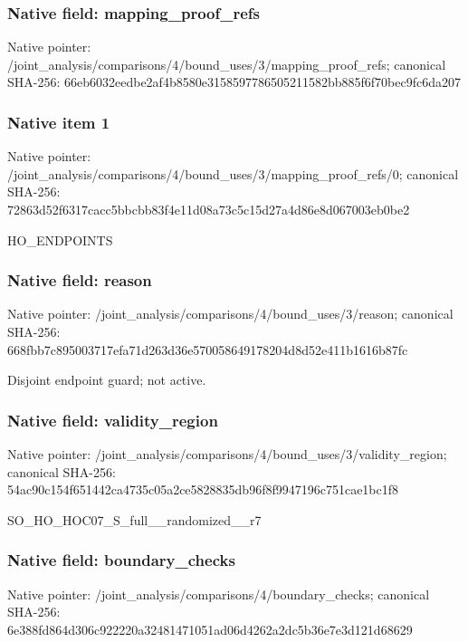 \documentclass[10pt,a4paper]{article}
\begin{document}
\subsubsection{Native field: mapping\_\allowbreak{}proof\_\allowbreak{}refs}
Native pointer: /joint\_\allowbreak{}analysis/comparisons/4/bound\_\allowbreak{}uses/3/mapping\_\allowbreak{}proof\_\allowbreak{}refs; canonical SHA-256: 66eb6032eedbe2af4b8580e3158597786505211582bb885f6f70bec9fc6da207

\subsubsection{Native item 1}
Native pointer: /joint\_\allowbreak{}analysis/comparisons/4/bound\_\allowbreak{}uses/3/mapping\_\allowbreak{}proof\_\allowbreak{}refs/0; canonical SHA-256: 72863d52f6317cacc5bbcbb83f4e11d08a73c5c15d27a4d86e8d067003eb0be2

\begingroup\raggedright\sloppy HO\_\allowbreak{}ENDPOINTS\par\endgroup

\subsubsection{Native field: reason}
Native pointer: /joint\_\allowbreak{}analysis/comparisons/4/bound\_\allowbreak{}uses/3/reason; canonical SHA-256: 668fbb7c895003717efa71d263d36e570058649178204d8d52e411b1616b87fc

\begingroup\raggedright\sloppy Disjoint endpoint guard;\allowbreak{} not active.\par\endgroup

\subsubsection{Native field: validity\_\allowbreak{}region}
Native pointer: /joint\_\allowbreak{}analysis/comparisons/4/bound\_\allowbreak{}uses/3/validity\_\allowbreak{}region; canonical SHA-256: 54ac90c154f651442ca4735c05a2ce5828835db96f8f9947196c751cae1bc1f8

\begingroup\raggedright\sloppy SO\_\allowbreak{}HO\_\allowbreak{}HOC07\_\allowbreak{}S\_\allowbreak{}full\_\allowbreak{}\_\allowbreak{}randomized\_\allowbreak{}\_\allowbreak{}r7\par\endgroup

\subsubsection{Native field: boundary\_\allowbreak{}checks}
Native pointer: /joint\_\allowbreak{}analysis/comparisons/4/boundary\_\allowbreak{}checks; canonical SHA-256: 6e388fd864d306c922220a32481471051ad06d4262a2dc5b36e7e3d121d68629
\end{document}
